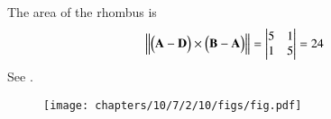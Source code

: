 The area of the rhombus is
\begin{align}
                \left\lVert\begin{pmatrix}\mathbf{A-D}\end{pmatrix}\times \begin{pmatrix}\mathbf{B-A}\end{pmatrix}\right\rVert=\begin{vmatrix}5 & 1\\1 & 5\end{vmatrix} = 24
\end{align}
See 
.
\begin{figure}[H]
 \begin{center}
  \texttt{[image: chapters/10/7/2/10/figs/fig.pdf]}
 \end{center}
\caption{}
\label{fig:chapters/10/7/2/10/gFig1}
\end{figure}

